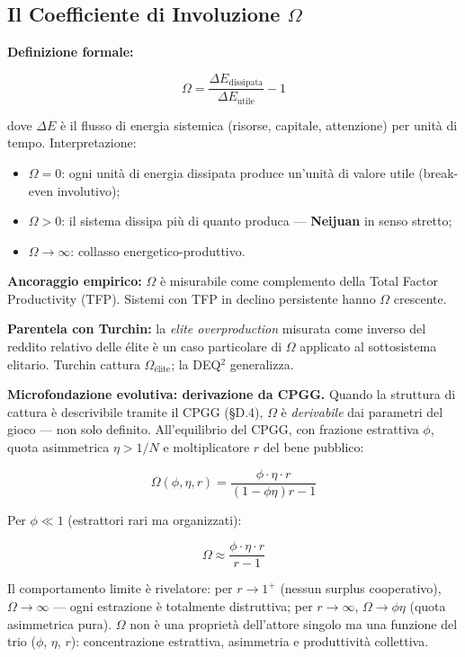 \subsection{\texorpdfstring{Il Coefficiente di Involuzione
\(\Omega\)}{Il Coefficiente di Involuzione \textbackslash Omega}}\label{il-coefficiente-di-involuzione-omega}

\Proved{} \textbf{Definizione formale:}

\[
\Omega = \frac{\Delta E_{\text{dissipata}}}{\Delta E_{\text{utile}}} - 1
\]

dove \(\Delta E\) è il flusso di energia sistemica (risorse, capitale,
attenzione) per unità di tempo. Interpretazione:

\begin{itemize}
\tightlist
\item
  \(\Omega = 0\): ogni unità di energia dissipata produce un'unità di
  valore utile (break-even involutivo);
\item
  \(\Omega > 0\): il sistema dissipa più di quanto produca ---
  \textbf{Neijuan} in senso stretto;
\item
  \(\Omega \to \infty\): collasso energetico-produttivo.
\end{itemize}

\Hypoth{} \textbf{Ancoraggio empirico:} \(\Omega\) è misurabile come
complemento della Total Factor Productivity (TFP). Sistemi con TFP in
declino persistente hanno \(\Omega\) crescente.

\Hypoth{} \textbf{Parentela con Turchin:} la \emph{elite overproduction}
misurata come inverso del reddito relativo delle élite è un caso
particolare di \(\Omega\) applicato al sottosistema elitario. Turchin
cattura \(\Omega_{\text{élite}}\); la DEQ$^2$ generalizza.

\Proved{} \textbf{Microfondazione evolutiva: derivazione da CPGG.}
Quando la struttura di cattura è descrivibile tramite il CPGG
(§D.4), \(\Omega\) è \emph{derivabile} dai parametri del gioco ---
non solo definito. All'equilibrio del CPGG, con frazione estrattiva
\(\phi\), quota asimmetrica \(\eta > 1/N\) e moltiplicatore \(r\) del
bene pubblico:

\[
\Omega(\phi,\eta,r) = \frac{\phi\cdot\eta\cdot r}{(1-\phi\eta)r - 1}
\]

Per \(\phi \ll 1\) (estrattori rari ma organizzati):

\[
\boxed{\Omega \approx \frac{\phi\cdot\eta\cdot r}{r-1}} \tag{P4}
\]

Il comportamento limite è rivelatore: per \(r \to 1^+\) (nessun
surplus cooperativo), \(\Omega \to \infty\) --- ogni estrazione è
totalmente distruttiva; per \(r \to \infty\), \(\Omega \to \phi\eta\)
(quota asimmetrica pura). \(\Omega\) non è una proprietà dell'attore
singolo ma una funzione del trio (\(\phi\), \(\eta\), \(r\)):
concentrazione estrattiva, asimmetria e produttività collettiva.




